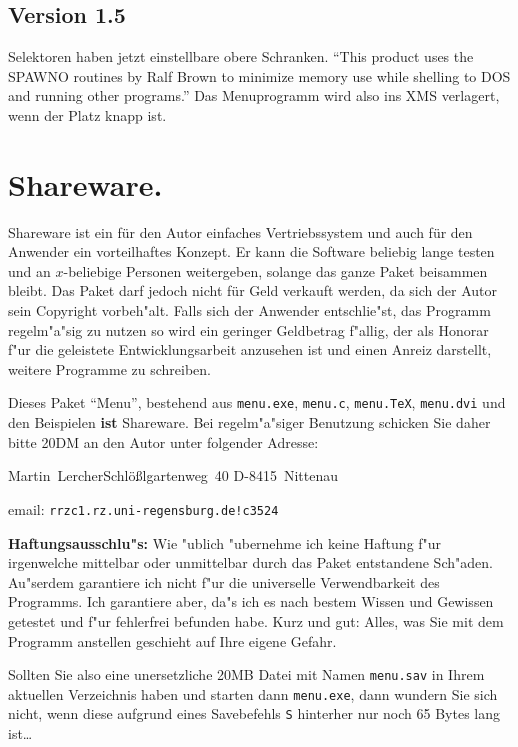 \subsection{Version 1.5}

Selektoren haben jetzt einstellbare obere Schranken. ``This product
uses the SPAWNO routines by Ralf Brown to minimize memory use while
shelling to DOS and running other programs.'' Das Menuprogramm wird also
ins XMS verlagert, wenn der Platz knapp ist.



\section{Shareware.}

Shareware ist ein f\"ur den Autor einfaches Vertriebssystem und auch
f\"ur den Anwender ein vorteilhaftes Konzept. Er kann die Software
beliebig lange testen und an $x$-beliebige Personen weitergeben, solange
das ganze Paket beisammen bleibt. Das Paket darf jedoch nicht f\"ur Geld
verkauft werden, da sich der Autor sein Copyright vorbeh"alt.
Falls sich der Anwender entschlie"st, das Programm regelm"a"sig zu
nutzen so wird ein geringer Geldbetrag f"allig, der als Honorar f"ur
die geleistete Entwicklungsarbeit anzusehen ist und einen Anreiz
darstellt, weitere Programme zu schreiben.

Dieses Paket "`Menu"', bestehend aus {\tt menu.exe}, {\tt menu.c}, 
{\tt menu.TeX}, {\tt menu.dvi} und den Beispielen {\bf ist} Shareware.
Bei regelm"a"siger Benutzung schicken Sie daher bitte 20DM an den Autor
unter folgender Adresse:

\medskip
\centerline{\vbox{\hbox{Martin Lercher}\hbox{Schl\"o\ss lgartenweg 40}%
\hbox{D-8415 Nittenau}}}
\smallskip

email: {\tt rrzc1.rz.uni-regensburg.de!c3524}

\medskip

{\bf Haftungsausschlu"s:}
Wie "ublich "ubernehme ich keine Haftung f"ur irgenwelche mittelbar oder
unmittelbar durch das Paket entstandene Sch"aden. Au"serdem garantiere
ich nicht f"ur die universelle Verwendbarkeit des Programms. Ich garantiere
aber, da"s ich es nach bestem Wissen und Gewissen getestet und f"ur
fehlerfrei befunden habe. Kurz und gut: Alles, was Sie mit dem Programm
anstellen geschieht auf Ihre eigene Gefahr.

Sollten Sie also eine unersetzliche 20MB Datei mit Namen {\tt menu.sav}
in Ihrem aktuellen Verzeichnis haben und starten dann {\tt menu.exe},
dann wundern Sie sich nicht, wenn diese aufgrund eines Savebefehls
\verb|S| hinterher nur noch 65 Bytes lang ist\dots

